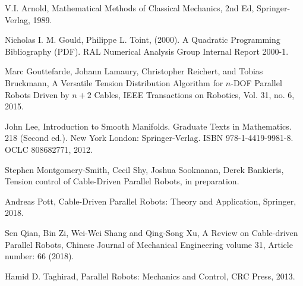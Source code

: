 \documentclass[oneside,twocolumn,reqno]{amsart}
\begin{document}
\begin{thebibliography}{99}

 V.I. Arnold, Mathematical Methods of Classical Mechanics, 2nd Ed, Springer-Verlag, 1989.

 Nicholas I. M. Gould, Philippe L. Toint, (2000). A Quadratic Programming Bibliography (PDF). RAL Numerical Analysis Group Internal Report 2000-1.

 Marc Gouttefarde, Johann Lamaury, Christopher Reichert, and Tobias Bruckmann, A Versatile Tension Distribution Algorithm for $n$-DOF Parallel Robots Driven by $n + 2$ Cables, IEEE Transactions on Robotics, Vol. 31, no. 6, 2015.

 John Lee, Introduction to Smooth Manifolds. Graduate Texts in Mathematics. 218 (Second ed.). New York London: Springer-Verlag. ISBN 978-1-4419-9981-8. OCLC 808682771, 2012.

 Stephen Montgomery-Smith, Cecil Shy, Joshua Sooknanan, Derek Bankieris, Tension control of Cable-Driven Parallel Robots, in preparation.

 Andreas Pott, Cable-Driven Parallel Robots: Theory and Application, Springer, 2018.

 Sen Qian, Bin Zi, Wei-Wei Shang and Qing-Song Xu, A Review on Cable-driven Parallel Robots, Chinese Journal of Mechanical Engineering volume 31, Article number: 66 (2018).

 Hamid D. Taghirad, Parallel Robots: Mechanics and Control, CRC Press, 2013.

\end{thebibliography}
\end{document}
